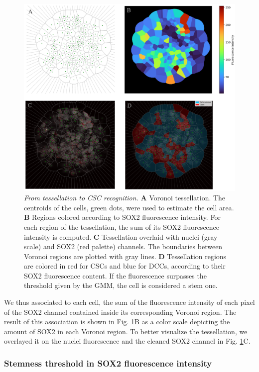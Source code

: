 \documentclass[fleqn,10pt]{wlscirep}
\begin{document}
\begin{figure}[!ht]
   \includegraphics[width=\textwidth]{images/tessellation_to_csc_recognition.eps}
   \caption{\emph{From tessellation to CSC recognition.} \textbf{A} Voronoi tessellation. The centroids of the cells, green dots, were used to estimate the cell area. \textbf{B} Regions colored according to SOX2 fluorescence intensity. For each region of the tessellation, the sum of its SOX2 fluorescence intensity is computed. \textbf{C} Tessellation overlaid with nuclei (gray scale) and SOX2 (red palette) channels. The boundaries between Voronoi regions are plotted with gray lines. \textbf{D} Tessellation regions are colored in red for CSCs and blue for DCCs, according to their SOX2 fluorescence content. If the fluorescence surpasses the threshold given by the GMM, the cell is considered a stem one.}
   \label{fig: tessellation to clustered}
\end{figure}

We thus associated to each cell, the sum of the fluorescence intensity of each pixel of the SOX2 channel contained inside its corresponding Voronoi region. The result of this association is shown in Fig. \ref{fig: tessellation to clustered}B as a color scale depicting the amount of SOX2 in each Voronoi region. To better visualize the tessellation, we overlayed it on the nuclei fluorescence and the cleaned SOX2 channel in Fig. \ref{fig: tessellation to clustered}C.


\subsubsection*{Stemness threshold in SOX2 fluorescence intensity}
\end{document}

